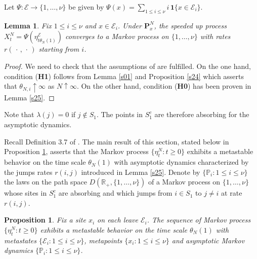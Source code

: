 \documentclass[reqno]{amsart}
\newtheorem{lemma}[theorem]{Lemma}
\newtheorem{proposition}[theorem]{Proposition}
\begin{document}
Let $\Psi: {{\mathcal E}}\to \{1,\dots, \nu\}$ be given by $\Psi(x) =
\sum_{1\le i\le\nu} i \, {{\mathbf 1}}\{x\in {{\mathcal E}}_i\}$.

\begin{lemma}
\label{s26}
Fix $1\le i\le \nu$ and $x\in {{\mathcal E}}_i$. Under ${{\mathbf P}}^N_x$, the speeded
up process $X^N_t = \Psi(\eta^{{{\mathcal E}}}_{t\theta_N(1)})$ converges to a
Markov process on $\{1, \dots, \nu\}$ with rates
$r(\,\cdot\,,\,\cdot\,)$ starting from $i$.
\end{lemma}

\begin{proof}
We need to check that the assumptions of \cite[Theorem 2.7]{bl2} are
fulfilled. On the one hand, condition ({\bf H1}) follows from Lemma
\ref{s01} and Proposition \ref{s24} which asserts that $\theta_{N,i}
\uparrow\infty$ as $N\uparrow\infty$. On the other hand, condition
({\bf H0}) has been proven in Lemma \ref{s25}.
\end{proof}

Note that $\lambda(j)=0$ if $j\not\in S_1$. The points in $S^c_1$ are
therefore absorbing for the asymptotic dynamics. 

Recall Definition 3.7 of \cite{bl2}.  The main result of this section,
stated below in Proposition \ref{s07}, asserts that the Markov process
$\{\eta^N_t : t\ge 0\}$ exhibits a metastable behavior on the time
scale $\theta_N(1)$ with asymptotic dynamics characterized by the
jumps rates $r(i,j)$ introduced in Lemma \ref{s25}. Denote by $\{{{\mathbb P}}_i : 1\le i\le \nu\}$ the laws on the path space $D({{\mathbb R}}_+, \{1,
\dots, \nu\})$ of a Markov process on $\{1, \dots, \nu\}$ whose sites
in $S_1^c$ are absorbing and which jumps from $i\in S_1$ to $j\not =
i$ at rate $r(i,j)$.

\begin{proposition}
\label{s07}
Fix a site $x_i$ on each leave ${{\mathcal E}}_i$. The sequence of Markov
process $\{\eta^N_t : t\ge 0\}$ exhibits a metastable behavior on the
time scale $\theta_N(1)$ with metastates $\{{{\mathcal E}}_i : 1\le i\le
\nu\}$, metapoints $\{x_i : 1\le i\le \nu\}$ and asymptotic Markov
dynamics $\{{{\mathbb P}}_i : 1\le i\le \nu\}$.
\end{proposition}
\end{document}

